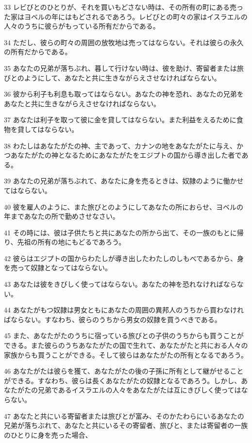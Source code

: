 \par 33 レビびとのひとりが、それを買いもどさない時は、その所有の町にある売った家はヨベルの年にはもどされるであろう。レビびとの町々の家はイスラエルの人々のうちに彼らがもっている所有だからである。
\par 34 ただし、彼らの町々の周囲の放牧地は売ってはならない。それは彼らの永久の所有だからである。
\par 35 あなたの兄弟が落ちぶれ、暮して行けない時は、彼を助け、寄留者または旅びとのようにして、あなたと共に生きながらえさせなければならない。
\par 36 彼から利子も利息も取ってはならない。あなたの神を恐れ、あなたの兄弟をあなたと共に生きながらえさせなければならない。
\par 37 あなたは利子を取って彼に金を貸してはならない。また利益をえるために食物を貸してはならない。
\par 38 わたしはあなたがたの神、主であって、カナンの地をあなたがたに与え、かつあなたがたの神となるためにあなたがたをエジプトの国から導き出した者である。
\par 39 あなたの兄弟が落ちぶれて、あなたに身を売るときは、奴隷のように働かせてはならない。
\par 40 彼を雇人のように、また旅びとのようにしてあなたの所におらせ、ヨベルの年まであなたの所で勤めさせなさい。
\par 41 その時には、彼は子供たちと共にあなたの所から出て、その一族のもとに帰り、先祖の所有の地にもどるであろう。
\par 42 彼らはエジプトの国からわたしが導き出したわたしのしもべであるから、身を売って奴隷となってはならない。
\par 43 あなたは彼をきびしく使ってはならない。あなたの神を恐れなければならない。
\par 44 あなたがもつ奴隷は男女ともにあなたの周囲の異邦人のうちから買わなければならない。すなわち、彼らのうちから男女の奴隷を買うべきである。
\par 45 また、あなたがたのうちに宿っている旅びとの子供のうちからも買うことができる。また彼らのうちあなたがたの国で生れて、あなたがたと共におる人々の家族からも買うことができる。そして彼らはあなたがたの所有となるであろう。
\par 46 あなたがたは彼らを獲て、あなたがたの後の子孫に所有として継がせることができる。すなわち、彼らは長くあなたがたの奴隷となるであろう。しかし、あなたがたの兄弟であるイスラエルの人々をあなたがたは互にきびしく使ってはならない。
\par 47 あなたと共にいる寄留者または旅びとが富み、そのかたわらにいるあなたの兄弟が落ちぶれて、あなたと共にいるその寄留者、旅びと、または寄留者の一族のひとりに身を売った場合、
